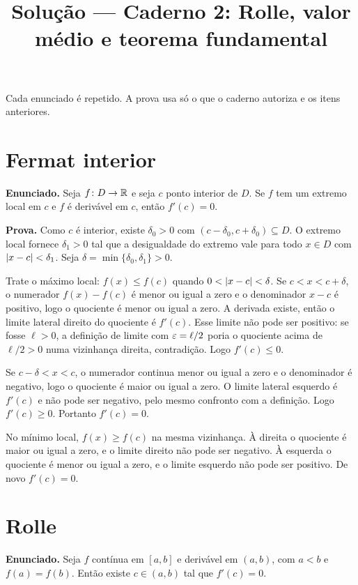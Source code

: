 \documentclass[11pt,a4paper]{article}
\title{Solução --- Caderno 2: Rolle, valor médio e teorema fundamental}
\author{}
\date{}
\begin{document}
\maketitle
\tableofcontents

Cada enunciado é repetido. A prova usa só o que o caderno autoriza e os itens anteriores.

\section{Fermat interior}

\textbf{Enunciado.} Seja $f\colon D\to\mathbb{R}$ e seja $c$ ponto interior de $D$. Se $f$ tem um extremo local em $c$ e $f$ é derivável em $c$, então $f'(c)=0$.

\textbf{Prova.}
Como $c$ é interior, existe $\delta_0>0$ com $(c-\delta_0,c+\delta_0)\subseteq D$. O extremo local fornece $\delta_1>0$ tal que a desigualdade do extremo vale para todo $x\in D$ com $\left\lvert x-c \right\rvert<\delta_1$. Seja $\delta=\min\{\delta_0,\delta_1\}>0$.

Trate o máximo local: $f(x)\le f(c)$ quando $0<\left\lvert x-c \right\rvert<\delta$. Se $c<x<c+\delta$, o numerador $f(x)-f(c)$ é menor ou igual a zero e o denominador $x-c$ é positivo, logo o quociente é menor ou igual a zero. A derivada existe, então o limite lateral direito do quociente é $f'(c)$. Esse limite não pode ser positivo: se fosse $\ell>0$, a definição de limite com $\varepsilon=\ell/2$ poria o quociente acima de $\ell/2>0$ numa vizinhança direita, contradição. Logo $f'(c)\le 0$.

Se $c-\delta<x<c$, o numerador continua menor ou igual a zero e o denominador é negativo, logo o quociente é maior ou igual a zero. O limite lateral esquerdo é $f'(c)$ e não pode ser negativo, pelo mesmo confronto com a definição. Logo $f'(c)\ge 0$. Portanto $f'(c)=0$.

No mínimo local, $f(x)\ge f(c)$ na mesma vizinhança. À direita o quociente é maior ou igual a zero, e o limite direito não pode ser negativo. À esquerda o quociente é menor ou igual a zero, e o limite esquerdo não pode ser positivo. De novo $f'(c)=0$.

\section{Rolle}

\textbf{Enunciado.} Seja $f$ contínua em $[a,b]$ e derivável em $(a,b)$, com $a<b$ e $f(a)=f(b)$. Então existe $c\in(a,b)$ tal que $f'(c)=0$.
\end{document}
